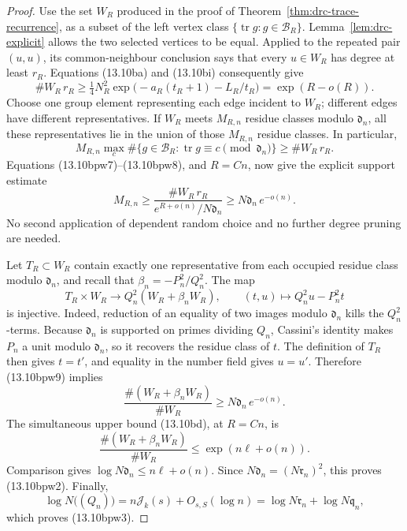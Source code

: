 \documentclass[11pt,reqno]{amsart}
\theoremstyle{definition}
\theoremstyle{remark}
\newcommand{\Tr}{\operatorname{tr}}
\begin{document}
\begin{proof}
Use the set \(W_R\) produced in the proof of
Theorem~\ref{thm:drc-trace-recurrence}, as a subset of the left vertex
class \(\{\Tr g:g\in\mathcal B_R\}\).  Lemma~\ref{lem:drc-explicit}
allows the two selected vertices to be equal.  Applied to the repeated
pair \((u,u)\), its common-neighbour conclusion says that every
\(u\in W_R\) has degree at least \(r_R\).  Equations (13.10ba) and
(13.10bi) consequently give
\[
 \#W_R\,r_R
 \ge \tfrac14N_R^2
       \exp\bigl(-a_R(t_R+1)-L_R/t_R\bigr)
 =\exp(R-o(R)).
\tag{13.10bpw8}
\]
Choose one group element representing each edge incident to \(W_R\);
different edges have different representatives.  If \(W_R\) meets
\(M_{R,n}\) residue classes modulo \(\mathfrak d_n\), all these
representatives lie in the union of those \(M_{R,n}\) residue classes.
In particular,
\[
 M_{R,n}\!
 \max_c\#\{g\in\mathcal B_R:
             \Tr g\equiv c\pmod{\mathfrak d_n}\}
 \ge \#W_R\,r_R.
\]
Equations (13.10bpw7)--(13.10bpw8), and \(R=Cn\), now give the explicit
support estimate
\[
 M_{R,n}
 \ge
 \frac{\#W_R\,r_R}{e^{R+o(n)}/N\mathfrak d_n}
 \ge N\mathfrak d_n\,e^{-o(n)}.
\tag{13.10bpw9}
\]
No second application of dependent random choice and no further degree
pruning are needed.

Let \(T_R\subset W_R\) contain exactly one representative from each
occupied residue class modulo \(\mathfrak d_n\), and recall that
\(\beta_n=-P_n^2/Q_n^2\).  The map
\[
 T_R\times W_R\longrightarrow
 Q_n^2(W_R+\beta_nW_R),\qquad
 (t,u)\longmapsto Q_n^2u-P_n^2t
\tag{13.10bpw10}
\]
is injective.  Indeed, reduction of an equality of two images modulo
\(\mathfrak d_n\) kills the \(Q_n^2\)-terms.  Because
\(\mathfrak d_n\) is supported on primes dividing \(Q_n\), Cassini's
identity makes \(P_n\) a unit modulo \(\mathfrak d_n\), so it recovers the residue class
of \(t\).  The definition of \(T_R\) then gives \(t=t'\), and equality in
the number field gives \(u=u'\).  Therefore (13.10bpw9) implies
\[
 \frac{\#(W_R+\beta_nW_R)}{\#W_R}
 \ge N\mathfrak d_n\,e^{-o(n)}.
\tag{13.10bpw11}
\]
The simultaneous upper bound (13.10bd), at \(R=Cn\), is
\[
 \frac{\#(W_R+\beta_nW_R)}{\#W_R}
 \le\exp(n\ell+o(n)).
\]
Comparison gives
\(\log N\mathfrak d_n\le n\ell+o(n)\).  Since
\(N\mathfrak d_n=(N\mathfrak r_n)^2\), this proves (13.10bpw2).
Finally,
\[
 \log N\bigl((Q_n)\bigr)
 =n\mathcal J_k(s)+O_{s,S}(\log n)
 =\log N\mathfrak r_n+\log N\mathfrak q_n,
\]
which proves (13.10bpw3).
\end{proof}
\end{document}
